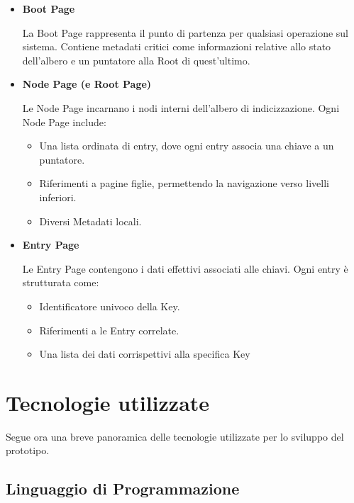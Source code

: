 \documentclass[12pt,a4paper,openright,twoside]{book}
\begin{document}
            \begin{itemize}
                \item \textbf{Boot Page}

                La Boot Page rappresenta il punto di partenza per qualsiasi operazione sul sistema. Contiene metadati critici come informazioni relative allo stato dell'albero e un puntatore alla Root di quest'ultimo.

                \item \textbf{Node Page (e Root Page)}

                Le Node Page incarnano i nodi interni dell’albero di indicizzazione. Ogni Node Page include:
                \begin{itemize}
                    \item Una lista ordinata di entry, dove ogni entry associa una chiave a un puntatore.
                    \item Riferimenti a pagine figlie, permettendo la navigazione verso livelli inferiori.
                    \item Diversi Metadati locali.
                \end{itemize}

                \item \textbf{Entry Page}

                Le Entry Page contengono i dati effettivi associati alle chiavi. Ogni entry è strutturata come:
                \begin{itemize}
                    \item Identificatore univoco della Key.
                    \item Riferimenti a le Entry correlate.
                    \item Una lista dei dati corrispettivi alla specifica Key
                \end{itemize}

            \end{itemize}

    \section{Tecnologie utilizzate}

        Segue ora una breve panoramica delle tecnologie utilizzate per lo sviluppo del prototipo.

        \subsection{Linguaggio di Programmazione}
\end{document}
